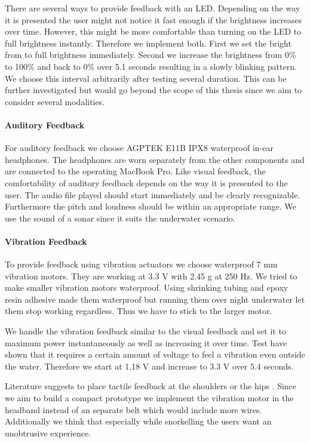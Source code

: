There are several ways to provide feedback with an LED.
Depending on the way it is presented the user might not notice it fast enough if the brightness increases over time.
However, this might be more comfortable than turning on the LED to full brightness instantly.
Therefore we implement both.
First we set the bright from to full brightness immediately.
Second we increase the brightness from 0\% to 100\%  and back to 0\% over 5.1 seconds resulting in a slowly blinking pattern.
We choose this interval arbitrarily after testing several duration.
This can be further investigated but would go beyond the scope of this thesis since we aim to consider several modalities.


\paragraph{Auditory Feedback}

For auditory feedback we choose AGPTEK E11B IPX8 waterproof in-ear headphones.
The headphones are worn separately from the other components and are connected to the operating MacBook Pro.
Like visual feedback, the comfortability of auditory feedback depends on the way it is presented to the user. 
The audio file played should start immediately and be clearly recognizable.
Furthermore the pitch and loudness should be within an appropriate range.
We use the sound of a sonar since it suits the underwater scenario.


\paragraph{Vibration Feedback}

To provide feedback using vibration actuators we choose waterproof 7 mm vibration motors.
They are working at 3.3 V with 2.45 g at 250 Hz.
We tried to make smaller vibration motors waterproof.
Using shrinking tubing and epoxy resin adhesive made them waterproof but running them over night underwater let them stop working regardless.
Thus we have to stick to the larger motor.

We handle the vibration feedback similar to the visual feedback and set it to maximum power instantaneously as well as increasing it over time.
Test have shown that it requires a certain amount of voltage to feel a vibration even outside the water.
Therefore we start at 1,18 V and increase to 3.3 V over 5.4 seconds.

Literature suggests to place tactile feedback at the shoulders or the hips \citep{Kiss:2018:NSM:3173574.3174191}.
Since we aim to build a compact prototype we implement the vibration motor in the headband instead of an separate belt which would include more wires.
Additionally we think that especially while snorkelling the users want an unobtrusive experience.


